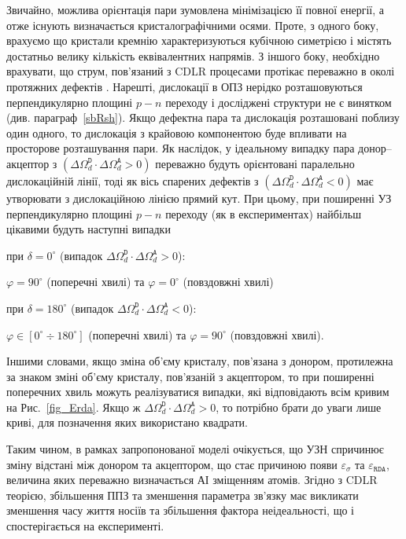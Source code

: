 Звичайно, можлива орієнтація пари зумовлена мінімізацією її повної енергії, а отже існують визначається кристалографічними осями.
Проте, з одного боку, врахуємо що кристали кремнію характеризуються кубічною симетрією і містять достатньо велику кількість еквівалентних напрямів.
З  іншого боку, необхідно врахувати,
що струм, пов'язаний з CDLR процесами протікає переважно в околі протяжних дефектів \cite{CDLR:JAP,CDLR:SSP}.
Нарешті, дислокації в ОПЗ нерідко розташовуються перпендикулярно площині $p-n$ переходу
і досліджені структури не є винятком (див. параграф~\ref{sbRsh}).
Якщо дефектна пара та дислокація розташовані поблизу один одного, то дислокація з крайовою компонентою буде впливати на просторове розташування пари.
Як наслідок, у ідеальному випадку пара донор--акцептор з  $(\Delta\Omega_d^\mathtt{D}\cdot\Delta\Omega_d^\mathtt{A}>0)$ переважно будуть орієнтовані
паралельно дислокаційній лінії,
тоді як вісь спарених дефектів з $(\Delta\Omega_d^\mathtt{D}\cdot\Delta\Omega_d^\mathtt{A}<0)$ має утворювати з дислокаційною лінією прямий кут.
При цьому, при поширенні УЗ перпендикулярно площині $p-n$ переходу (як в експериментах)
найбільш цікавими будуть наступні випадки

\noindent при  $\delta=0^\circ$ (випадок $\Delta\Omega_d^\mathtt{D}\cdot\Delta\Omega_d^\mathtt{A}>0$):
\begin{center}
\noindent   $\varphi=90^\circ$ (поперечні хвилі)  та $\varphi=0^\circ$ (повздовжні хвилі)
\end{center}

\noindent при  $\delta=180^\circ$ (випадок $\Delta\Omega_d^\mathtt{D}\cdot\Delta\Omega_d^\mathtt{A}<0$):
\begin{center}
\noindent   $\varphi\in[0^\circ\div 180^\circ]$ (поперечні хвилі)  та $\varphi=90^\circ$ (повздовжні хвилі).
\end{center}

Іншими словами,
якщо зміна об'єму кристалу, пов'язана з донором, протилежна за знаком зміні об'єму кристалу, пов'язаній з акцептором, то
при поширенні поперечних хвиль можуть реалізуватися випадки, які відповідають всім кривим на Рис.~\ref{fig_Erda}.
Якщо ж $\Delta\Omega_d^\mathtt{D}\cdot\Delta\Omega_d^\mathtt{A}>0$, то потрібно брати до уваги лише криві, для позначення
яких використано квадрати.


Таким чином, в рамках запропонованої моделі очікується, що УЗН спричинює зміну відстані між донором та акцептором,
що стає причиною появи $\varepsilon_{\sigma}$ та $\varepsilon_{\mathtt{RDA}}$, величина яких переважно визначається АІ зміщенням атомів.
Згідно з CDLR теорією,
збільшення ППЗ та зменшення параметра зв'язку має викликати зменшення часу життя носіїв та збільшення фактора неідеальності,
що і спостерігається на експерименті.



